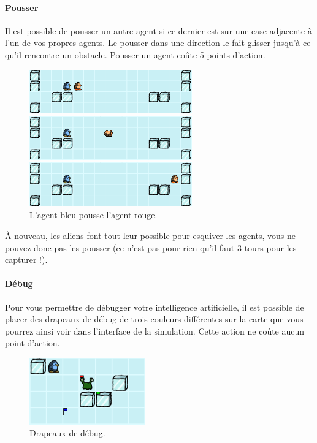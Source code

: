 \newpage
\paragraph{Pousser}\label{pousser}

Il est possible de pousser un autre agent si ce dernier est sur une case
adjacente à l'un de vos propres agents. Le pousser dans une direction le
fait glisser jusqu'à ce qu'il rencontre un obstacle. Pousser un agent
coûte 5 points d'action.

\begin{figure}[!h]
    \centering
    \includegraphics[width=7cm]{img/push1}

    \vspace{0.5cm}
    \includegraphics[width=7cm]{img/push2}

    \vspace{0.5cm}
    \includegraphics[width=7cm]{img/push3}

    \caption*{L'agent bleu pousse l'agent rouge.}
\end{figure}

À nouveau, les aliens font tout leur possible pour esquiver les agents,
vous ne pouvez donc pas les pousser (ce n'est pas pour rien qu'il faut 3
tours pour les capturer !).

\paragraph{Débug}\label{duxe9bug}

Pour vous permettre de débugger votre intelligence artificielle, il est
possible de placer des drapeaux de débug de trois couleurs différentes
sur la carte que vous pourrez ainsi voir dans l'interface de la
simulation. Cette action ne coûte aucun point d'action.

\begin{figure}[!h]
    \centering
    \includegraphics[width=5cm]{img/debug_flags}
    \caption*{Drapeaux de débug.}
\end{figure}

